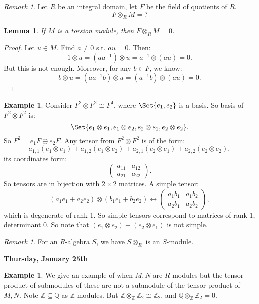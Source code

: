 \documentclass[9pt,reqno,twoside]{amsbook}
\theoremstyle{plain}
\numberwithin{section}{chapter}
\numberwithin{equation}{chapter}
\newtheorem{lem}[theorem]{Lemma}
\theoremstyle{definition}
\newtheorem{Ex}[theorem]{Example}
\theoremstyle{remark}
\newtheorem{rem}[theorem]{Remark}
\theoremstyle{plain}
\newcommand{\sub}{\subseteq}
\newcommand{\z}{\mathbb{Z}}
\newcommand{\Q}{\mathbb{Q}}
\newcommand{\tens}{\otimes}
\begin{document}
\begin{rem}
Let $R$ be an integral domain, let $F$ be the field of quotients of $R$. 
$$
F \tens_R M = ?
$$
\end{rem}

\begin{lem}
If $M$ is a torsion module, then $F \tens_R M = 0$. 
\end{lem}

\begin{proof}
Let $u \in M$. Find $a \neq 0$ s.t. $au = 0$. Then:
$$
1 \tens u = (aa^{-1})\tens u = a^{-1} \tens (au) = 0.
$$
But this is not enough. Moreover, for any $b \in F$, we know: 
$$
b \tens u = (aa^{-1}b) \tens u = (a^{-1}b) \tens (au) = 0.
$$
\end{proof}

\begin{Ex}
Consider $F^2 \tens F^2 \cong F^4$, where $\Set{e_1,e_2}$ is a basis. So basis of $F^2 \tens F^2$ is:
$$
\Set{e_1 \tens e_1,e_1 \tens e_2,e_2 \tens e_1,e_2 \tens e_2}.
$$
So $F^2 = e_1F \oplus e_2F$. Any tensor from $F^2 \tens F^2$ is of the form:
$$
a_{1,1}(e_1 \tens e_1) + a_{1,2}(e_1 \tens e_2) + a_{2,1}(e_2 \tens e_1) + a_{2,2}(e_2 \tens e_2),
$$
its coordinates form: 
$$
\left( 
\begin{matrix}
a_{11} & a_{12}\\
a_{21} & a_{22}
\end{matrix}
\right).
$$
So tensors are in bijection with $2 \times 2$ matrices. A simple tensor: 
$$
(a_1e_1 + a_2e_2) \tens (b_1e_1 + b_2e_2) \leftrightarrow 
\left(
\begin{matrix}
a_1b_1 & a_1b_2\\
a_2b_1 & a_2 b_2
\end{matrix}
\right),
$$
which is degenerate of rank 1. So simple tensors correspond to matrices of rank 1, determinant 0. So note that $(e_1 \tens e_2) + (e_2 \tens e_1)$ is not simple. 
\end{Ex}

\begin{rem}
For an $R$-algebra $S$, we have $S \tens_R$ is an $S$-module. 
\end{rem}


\textbf{Thursday, January 25th}
\vspace{5mm}
\begin{Ex}
We give an example of when $M,N$ are $R$-modules but the tensor product of submodules of these are not a submodule of the tensor product of $M,N$. Note $\z \sub \Q$ as $\z$-modules. But $\z \tens_\z \z_2 \cong \z_2$, and $\Q \tens_\z \z_2 = 0$. 
\end{Ex}
\end{document}
